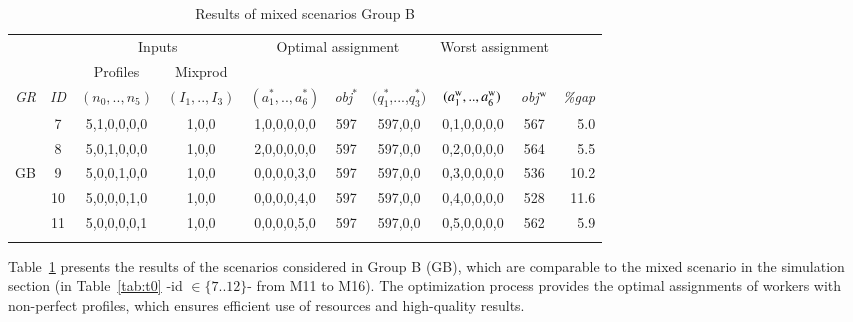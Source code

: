 \documentclass[review,12pt, 3p, times]{elsarticle}
\begin{document}
					
\begin{longtable}{|c|c|c|c|c|c|c|c|c|r|}
	\hline
	& & \multicolumn{2}{c|}{Inputs} & \multicolumn{3}{c|}{Optimal assignment} & \multicolumn{2}{c|}{Worst assignment }& \\
	& \multicolumn{1}{c|}{ } & \multicolumn{1}{c|}{Profiles} & \multicolumn{1}{c|}{Mixprod}& \multicolumn{1}{c}{}  & \multicolumn{2}{c|}{} & \multicolumn{2}{c|}{}&\multicolumn{1}{c|}{}\\
	\it{GR} & \it{ID} & \multicolumn{1}{c|}{$(n_0,..,n_5)$} & \multicolumn{1}{c|}{$(I_1,..,I_3)$} & {$(a^*_1,..,a^*_6)$} & \it{obj}$^*$ & $(q^*_1$,...,$q^*_3)$ & {$(a^{\textsc{w}}_1,..,a^{\textsc{w}}_6)$} & \it{obj}$^{\textsc{w}}$ & \it{\%gap} \\ %
	\hline
	        & 7       & 5,1,0,0,0,0                         & 1,0,0                               & 1,0,0,0,0,0          & 597          & 597,0,0               & 0,1,0,0,0,0                                & 567                     & 5.0        \\
	        & 8       & 5,0,1,0,0,0                         & 1,0,0                               & 2,0,0,0,0,0          & 597          & 597,0,0               & 0,2,0,0,0,0                                & 564                     & 5.5        \\
	GB      & 9       & 5,0,0,1,0,0                         & 1,0,0                               & 0,0,0,0,3,0          & 597          & 597,0,0               & 0,3,0,0,0,0                                & 536                     & 10.2       \\
	        & 10      & 5,0,0,0,1,0                         & 1,0,0                               & 0,0,0,0,4,0          & 597          & 597,0,0               & 0,4,0,0,0,0                                & 528                     & 11.6       \\
	        & 11      & 5,0,0,0,0,1                         & 1,0,0                               & 0,0,0,0,5,0          & 597          & 597,0,0               & 0,5,0,0,0,0                                & 562                     & 5.9        \\
	\hline
	\caption{Results of mixed scenarios  Group B} 													
	\label{tab:tr_gb}
\end{longtable}
										
Table~\ref{tab:tr_gb} presents the results of the scenarios considered in Group B (GB), which are comparable to the mixed scenario in the simulation section (in Table~\ref{tab:t0} -id $\in \{7..12\}$- from M11 to M16). The optimization process provides the optimal assignments of workers with non-perfect profiles, which ensures efficient use of resources and high-quality results.
			
\end{document}
